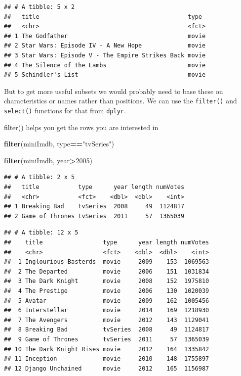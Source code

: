 \documentclass[]{book}
\newenvironment{Shaded}{\begin{snugshade}}{\end{snugshade}}
\newcommand{\DecValTok}[1]{\textcolor[rgb]{0.00,0.00,0.81}{#1}}
\newcommand{\KeywordTok}[1]{\textcolor[rgb]{0.13,0.29,0.53}{\textbf{#1}}}
\newcommand{\NormalTok}[1]{#1}
\newcommand{\OperatorTok}[1]{\textcolor[rgb]{0.81,0.36,0.00}{\textbf{#1}}}
\newcommand{\StringTok}[1]{\textcolor[rgb]{0.31,0.60,0.02}{#1}}
\begin{document}
\begin{verbatim}
## # A tibble: 5 x 2
##   title                                          type 
##   <chr>                                          <fct>
## 1 The Godfather                                  movie
## 2 Star Wars: Episode IV - A New Hope             movie
## 3 Star Wars: Episode V - The Empire Strikes Back movie
## 4 The Silence of the Lambs                       movie
## 5 Schindler's List                               movie
\end{verbatim}

But to get more useful subsets we would probably need to base these on characteristics or names rather than positions. We can use the \texttt{filter()} and \texttt{select()} functions for that from \texttt{dplyr}.

filter() helps you get the rows you are interested in

\begin{Shaded}
\begin{Highlighting}[]
\KeywordTok{filter}\NormalTok{(miniImdb, type}\OperatorTok{==}\StringTok{"tvSeries"}\NormalTok{)}
\end{Highlighting}
\end{Shaded}

\begin{Shaded}
\begin{Highlighting}[]
\KeywordTok{filter}\NormalTok{(miniImdb, year}\OperatorTok{>}\DecValTok{2005}\NormalTok{)}
\end{Highlighting}
\end{Shaded}

\begin{verbatim}
## # A tibble: 2 x 5
##   title           type      year length numVotes
##   <chr>           <fct>    <dbl>  <dbl>    <int>
## 1 Breaking Bad    tvSeries  2008     49  1124817
## 2 Game of Thrones tvSeries  2011     57  1365039
\end{verbatim}

\begin{verbatim}
## # A tibble: 12 x 5
##    title                 type      year length numVotes
##    <chr>                 <fct>    <dbl>  <dbl>    <int>
##  1 Inglourious Basterds  movie     2009    153  1069563
##  2 The Departed          movie     2006    151  1031834
##  3 The Dark Knight       movie     2008    152  1975810
##  4 The Prestige          movie     2006    130  1020039
##  5 Avatar                movie     2009    162  1005456
##  6 Interstellar          movie     2014    169  1218930
##  7 The Avengers          movie     2012    143  1129041
##  8 Breaking Bad          tvSeries  2008     49  1124817
##  9 Game of Thrones       tvSeries  2011     57  1365039
## 10 The Dark Knight Rises movie     2012    164  1335842
## 11 Inception             movie     2010    148  1755897
## 12 Django Unchained      movie     2012    165  1156987
\end{verbatim}
\end{document}

